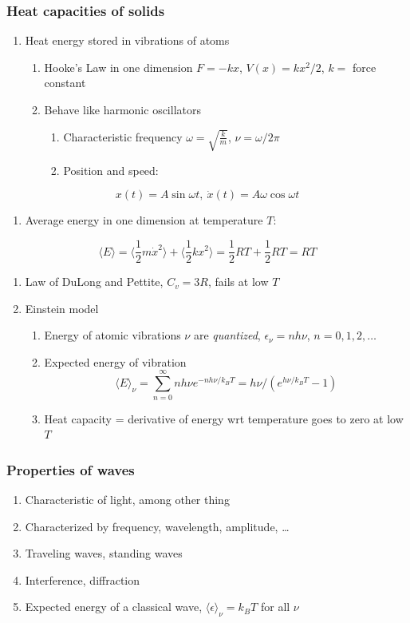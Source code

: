 \documentclass[11pt]{article}
\begin{document}
\subsubsection{Heat capacities of solids}
\label{sec:orgab1410a}
\begin{enumerate}
\item Heat energy stored in vibrations of atoms
\begin{enumerate}
\item Hooke's Law in one dimension \(F=-kx\), \(V(x)=kx^2/2\), \(k =\) force constant
\item Behave like harmonic oscillators
\begin{enumerate}
\item Characteristic frequency \(\omega = \sqrt{\frac{k}{m}}\),  \(\nu =\omega/2\pi\)
\item Position and speed:
\end{enumerate}
\end{enumerate}
\end{enumerate}
\[ x(t) = A \sin \omega t,\ \dot{x}(t)= A \omega \cos \omega t \]
\begin{enumerate}
\item Average energy in one dimension at temperature \(T\):
\end{enumerate}
\[ \langle E \rangle = \langle \frac{1}{2} m \dot{x}^2 \rangle + \langle \frac{1}{2}kx^2 \rangle = \frac{1}{2}RT+\frac{1}{2}RT =RT \]
\begin{enumerate}
\item Law of DuLong and Pettite, \(C_v = 3R\), fails at low \(T\)
\item Einstein model
\begin{enumerate}
\item Energy of atomic vibrations \(\nu\) are \emph{quantized}, \(\epsilon_\nu=nh\nu\), \(n = 0,1,2, \ldots\)
\item Expected energy of vibration
\[\langle E \rangle_\nu = \sum_{n=0}^\infty nh\nu e^{-nh\nu/k_BT} = h\nu/\left (
          e^{h\nu/k_BT}-1 \right )\]
\item Heat capacity = derivative of energy wrt temperature goes to zero at low \(T\)
\end{enumerate}
\end{enumerate}
\subsubsection{Properties of waves}
\label{sec:org3c9b2b2}
\begin{enumerate}
\item Characteristic of light, among other thing
\item Characterized by frequency, wavelength, amplitude, \ldots
\item Traveling waves, standing waves
\item Interference, diffraction
\item Expected energy of a classical wave, \(\langle \epsilon \rangle _\nu = k_B T\) for all \(\nu\)
\end{enumerate}
\end{document}
